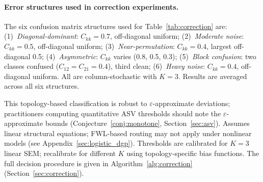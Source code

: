 \begin{table}[H]
\centering
\caption{RMSE reduction (\%) by correction method and DAG topology.}
\label{tab:correction}
\end{table}

\paragraph{Error structures used in correction experiments.}
The six confusion matrix structures used for Table~\ref{tab:correction} are:
(1)~\emph{Diagonal-dominant}: $C_{kk}{=}0.7$, off-diagonal uniform;
(2)~\emph{Moderate noise}: $C_{kk}{=}0.5$, off-diagonal uniform;
(3)~\emph{Near-permutation}: $C_{kk}{=}0.4$, largest off-diagonal 0.5;
(4)~\emph{Asymmetric}: $C_{kk}$ varies (0.8, 0.5, 0.3);
(5)~\emph{Block confusion}: two classes confused ($C_{12}{=}C_{21}{=}0.4$), third clean;
(6)~\emph{Heavy noise}: $C_{kk}{=}0.4$, off-diagonal uniform.
All are column-stochastic with $K{=}3$. Results are averaged across all six structures.

This topology-based classification is robust to $\varepsilon$-approximate deviations; practitioners computing quantitative ASV thresholds should note the $\varepsilon$-approximate bounds (Conjecture~\ref{conj:monotone}, Section~\ref{sec:asv}). Assumes linear structural equations; FWL-based routing may not apply under nonlinear models (see Appendix~\ref{sec:logistic_dgp}). Thresholds are calibrated for $K{=}3$ linear SEM; recalibrate for different $K$ using topology-specific bias functions. The full decision procedure is given in Algorithm~\ref{alg:correction} (Section~\ref{sec:correction}).

